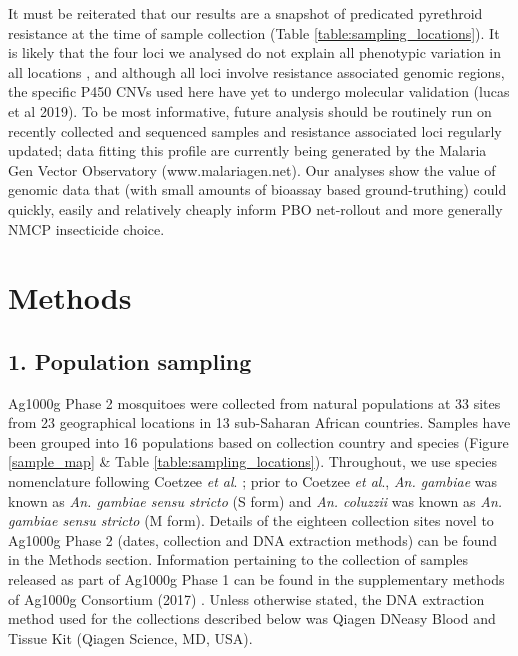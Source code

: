 \documentclass[a4paper,11pt,abstracton,hidelinks]{scrartcl}
\begin{document}
It must be reiterated that our results are a snapshot of predicated pyrethroid resistance at the time of sample collection (Table \ref{table:sampling_locations}).
%
It is likely that the four loci we analysed do not explain all phenotypic variation in all locations \cite{donnelly2009}, and although all loci involve resistance associated genomic regions, the specific P450 CNVs used here have yet to undergo molecular validation (lucas et al 2019).
%
To be most informative, future analysis should be routinely run on recently collected and sequenced samples and resistance associated loci regularly updated;
%
data fitting this profile are currently being generated by the Malaria Gen Vector Observatory (www.malariagen.net).
%
Our analyses show the value of genomic data that (with small amounts of bioassay based ground-truthing) could quickly, easily and relatively cheaply inform PBO net-rollout and more generally NMCP insecticide choice.



\section*{Methods}


\subsection*{1. Population sampling}

%
Ag1000g Phase 2 mosquitoes were collected from natural populations at 33 sites from 23
geographical locations in 13 sub-Saharan African countries. 
%
Samples have been grouped into 16 populations based on collection country and species (Figure \ref{sample_map} \& Table \ref{table:sampling_locations}).
%
Throughout, we use species nomenclature following Coetzee \textit{et al}. \cite{Coetzee2013};	
%
prior to	 Coetzee	 \textit{et al}., \textit{An. gambiae} was known as \textit{An. gambiae sensu stricto} (S form) and \textit{An. coluzzii} was known as \textit{An. gambiae sensu stricto} (M form).
%
Details of the eighteen collection sites novel to Ag1000g Phase 2 (dates, collection and DNA extraction methods) can be found in the Methods section.
%
Information pertaining to the collection of samples released as part of Ag1000g Phase 1 can be found in the supplementary methods of Ag1000g Consortium (2017) \cite{Ag1000gConsortium2017}.
%
Unless otherwise stated, the DNA extraction method used for the collections described below was Qiagen DNeasy Blood and Tissue Kit (Qiagen Science, MD, USA).
\end{document}

